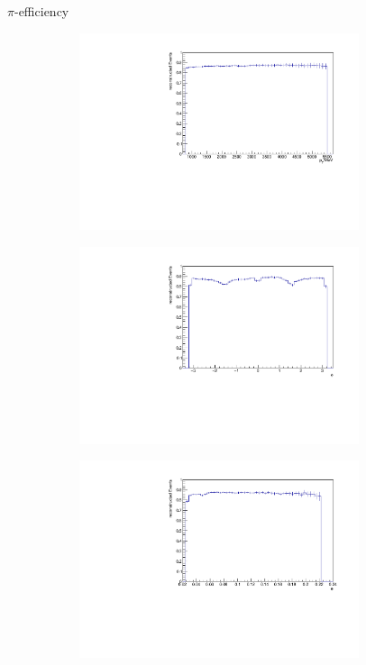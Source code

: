 \documentclass[11pt]{beamer}
\begin{document}
\begin{frame}{$\pi$-efficiency}
\begin{figure}
\begin{subfigure}{0.45\textwidth}
\includegraphics[width=0.9\textwidth]{up_pdf/tot/h_pt_reco_Pi.pdf}
\end{subfigure}
\begin{subfigure}{0.45\textwidth}
\includegraphics[width=0.9\textwidth]{up_pdf/tot/h_phi_reco_Pi.pdf}
\end{subfigure}
\begin{subfigure}{0.45\textwidth}
\includegraphics[width=0.9\textwidth]{up_pdf/tot/h_theta_reco_Pi.pdf}

\end{subfigure}
\end{figure}
\end{frame}
\end{document}
